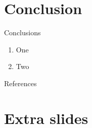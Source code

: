 \documentclass[
aspectratio=169,
16pt,
xcolor={dvipsnames} %
]{beamer}
\begin{document}
\section{Conclusion}
\begin{frame}[t]{Conclusions}
	\begin{enumerate}
		\item One
		\item Two
	\end{enumerate}
\end{frame}


\begin{frame}[t]{References}
\printbibliography
\end{frame}


\section{Extra slides}
\end{document}
